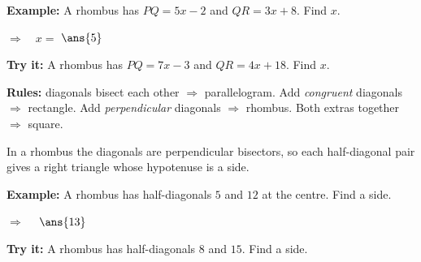\documentclass[12pt]{article}
\begin{document}
\begin{examplebox}
\textbf{Example:} \quad A rhombus has $PQ = 5x - 2$ and $QR = 3x + 8$. Find $x$.

$\Rightarrow\quad x = $ $\ans{5}$
\end{examplebox}

\begin{tryitbox}
\textbf{Try it:} \quad A rhombus has $PQ = 7x - 3$ and $QR = 4x + 18$. Find $x$.\\[2pt]
\end{tryitbox}


\begin{formulabox}
\textbf{Rules:} diagonals bisect each other $\Rightarrow$ parallelogram. Add \emph{congruent} diagonals $\Rightarrow$ rectangle. Add \emph{perpendicular} diagonals $\Rightarrow$ rhombus. Both extras together $\Rightarrow$ square.\par
In a rhombus the diagonals are perpendicular bisectors, so each half-diagonal pair gives a right triangle whose hypotenuse is a side.
\end{formulabox}

\begin{examplebox}
\textbf{Example:} \quad A rhombus has half-diagonals $5$ and $12$ at the centre. Find a side.

$\Rightarrow\quad$ $\ans{13}$
\end{examplebox}

\begin{tryitbox}
\textbf{Try it:} \quad A rhombus has half-diagonals $8$ and $15$. Find a side.\\[2pt]
\end{tryitbox}
\end{document}
